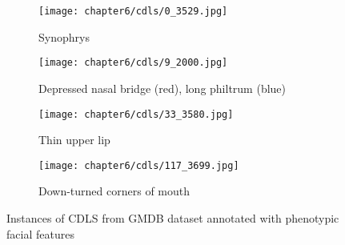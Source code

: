 \documentclass[../report.tex]{subfiles}
\begin{document}
	\begin{figure}[H]
		\centering
		\begin{subfigure}[t]{0.24\textwidth}
			\centering
			\texttt{[image: chapter6/cdls/0\_3529.jpg]}
			\caption{Synophrys}
		\end{subfigure}
		\begin{subfigure}[t]{0.24\textwidth}
			\centering
			\texttt{[image: chapter6/cdls/9\_2000.jpg]}
			\caption{Depressed nasal bridge (red), long philtrum (blue)}
		\end{subfigure}	
		\begin{subfigure}[t]{0.24\textwidth}
			\centering
			\texttt{[image: chapter6/cdls/33\_3580.jpg]}
			\caption{Thin upper lip}
		\end{subfigure}	
		\begin{subfigure}[t]{0.24\textwidth}
			\centering
			\texttt{[image: chapter6/cdls/117\_3699.jpg]}
			\caption{Down-turned corners of mouth}
		\end{subfigure}
		\caption[Instances of CDLS from GMDB dataset]{Instances of CDLS from GMDB dataset annotated with phenotypic facial features}
		\label{fig_cdls}
	\end{figure}
	
\end{document}
